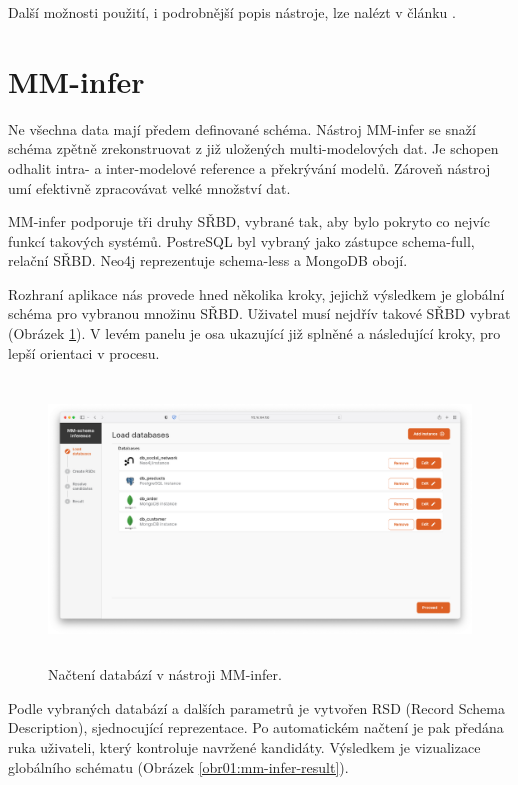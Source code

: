 Další možnosti použití, i podrobnější popis nástroje, lze nalézt v článku \citet{MMcat}.


\section{MM-infer}

Ne všechna data mají předem definované schéma. Nástroj MM-infer se snaží schéma zpětně zrekonstruovat z již uložených multi-modelových dat. Je schopen odhalit intra- a inter-modelové reference a překrývání modelů. Zároveň nástroj umí efektivně zpracovávat velké množství dat.

MM-infer podporuje tři druhy SŘBD, vybrané tak, aby bylo pokryto co nejvíc funkcí takových systémů. PostreSQL byl vybraný jako zástupce schema-full, relační SŘBD. Neo4j reprezentuje schema-less a MongoDB obojí. 

Rozhraní aplikace nás provede hned několika kroky, jejichž výsledkem je globální schéma pro vybranou množinu SŘBD. Uživatel musí nejdřív takové SŘBD vybrat (Obrázek \ref{obr01:mm-infer-load-database}). V levém panelu je osa ukazující již splněné a následující kroky, pro lepší orientaci v procesu.

\begin{figure}[htb]
  \centering
  \includegraphics[height=75mm]{../img/mm-infer-load-database}
  \caption{Načtení databází v nástroji MM-infer.}
  \label{obr01:mm-infer-load-database}
\end{figure}

Podle vybraných databází a dalších parametrů je vytvořen RSD (Record Schema Description), sjednocující reprezentace. Po automatickém načtení je pak předána ruka uživateli, který kontroluje navržené kandidáty. Výsledkem je vizualizace globálního schématu (Obrázek \ref{obr01:mm-infer-result}).

